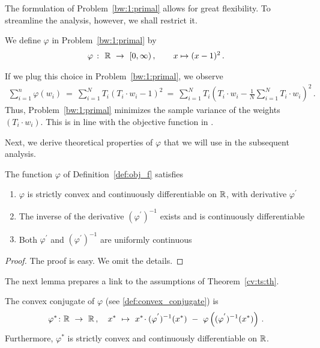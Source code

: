 The formulation of Problem~\ref{bw:1:primal} allows for great 
flexibility.
%
To streamline the analysis, however, we shall restrict it.
%
\begin{definition}
  \label{def:obj_f}
  We define $\varphi$ in Problem~\ref{bw:1:primal} by
  \begin{align*}
    \varphi
    \ 
    \colon
    \ 
    \R
    \ 
    \to
    \ 
    [0,\infty)
    \,,
    \qquad
    x\mapsto (x-1)^2
    \,.
  \end{align*}
\end{definition}
\begin{remark}
  If we plug this choice in Problem~\ref{bw:1:primal},
  we observe
  \begin{align*}
    \sum_{i=1}^{n} 
\varphi(w_i)
\ 
=
\ 
    \sum_{i=1}^{N}
    T_i
    \left( 
      T_i\cdot w_i
      -
      1
    \right)
    ^{2}
\ 
=
\ 
    \sum_{i=1}^{N}
    T_i
    \left( 
      T_i\cdot w_i
      -
      \frac{1}{N}
      \sum_{i=1}^{N} 
      T_i\cdot w_i
    \right)
    ^{2}
    \,.
  \end{align*}
  Thus, Problem~\ref{bw:1:primal} minimizes the sample variance of the weights 
  $(T_i\cdot w_i)$. This is in line with the objective function in \cite{Zubizarreta2015}.
\end{remark}
Next, we derive theoretical properties of $\varphi$ that we will use in the subsequent analysis.
\begin{lemma}
  \label{lem:obj_f}
  The function $\varphi$ of Definition~\ref{def:obj_f} satisfies

  \begin{enumerate}[label=(\roman*)]
    \item $\varphi$ is strictly convex and continuously differentiable on $\mathbb{R}$, with derivative $\varphi^{'}$
    \item
      The inverse of the derivative 
      $(\varphi^{'})^{-1}$
      exists and is continuously differentiable
    \item
      Both $\varphi^{'}$ and
      $(\varphi^{'})^{-1}$
      are uniformly continuous
  \end{enumerate}
\end{lemma}
\begin{proof}
  The proof is easy. We omit the details.
\end{proof}
The next lemma prepares a link to the assumptions of Theorem~\ref{cv:ts:th}.
\begin{lemma}
  \label{1165}
  The convex conjugate of $\varphi$ (see \eqref{def:convex_conjugate}) is
  \begin{gather*}
    \varphi^*
    \colon
    \R
    \ 
    \to
    \ 
    \R
    \,,
    \quad
    x^*
    \ 
    \mapsto
    \ 
    x^*
    \!
    \cdot
    (
    \varphi^{'}
    )^{-1}
    (x^*)
    \ 
    -
    \ 
    \varphi
    \left( 
      (
    \varphi^{'}
    )^{-1}
    (x^*)
    \right)
    \,.
  \end{gather*}
  Furthermore, $\varphi^*$ is strictly convex and continuously differentiable on $\mathbb{R}$.
\end{lemma}
